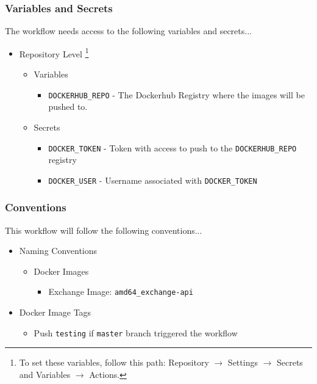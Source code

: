 \documentclass[a4paper,11pt]{article}
\begin{document}
\subsubsection{Variables and Secrets}
The workflow needs access to the following variables and secrets...
\begin{itemize}
    \item Repository Level \footnote{To set these variables, follow this path: Repository $\rightarrow$ Settings $\rightarrow$ Secrets and Variables $\rightarrow$ Actions.}
    \begin{itemize}
        \item Variables
        \begin{itemize}
            \item\verb|DOCKERHUB_REPO| - The Dockerhub Registry where the images will be pushed to.
        \end{itemize}
        \item Secrets
        \begin{itemize}
            \item\verb|DOCKER_TOKEN| - Token with access to push to the \verb|DOCKERHUB_REPO| registry
            \item\verb|DOCKER_USER| - Username associated with \verb|DOCKER_TOKEN|
        \end{itemize}
    \end{itemize}
\end{itemize}

\subsubsection{Conventions}
This workflow will follow the following conventions...
\begin{itemize}
    \item Naming Conventions
    \begin{itemize}
        \item Docker Images
        \begin{itemize}
            \item Exchange Image: \verb|amd64_exchange-api|
        \end{itemize}
    \end{itemize}
    \item{Docker Image Tags}
    \begin{itemize}
        \item Push \verb|testing| if \verb|master| branch triggered the workflow
    \end{itemize}
\end{itemize}
\end{document}
